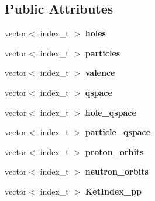 \subsection*{Public Attributes}
\begin{DoxyCompactItemize}
\item 
\hypertarget{classModelSpace_a540070f4df481d7fb5862d9c392e73c3}{vector$<$ index\-\_\-t $>$ {\bfseries holes}}\label{classModelSpace_a540070f4df481d7fb5862d9c392e73c3}

\item 
\hypertarget{classModelSpace_a5e3511a14dcd3cea30815de14100812c}{vector$<$ index\-\_\-t $>$ {\bfseries particles}}\label{classModelSpace_a5e3511a14dcd3cea30815de14100812c}

\item 
\hypertarget{classModelSpace_a2cb4a1691177ce70d7e538866b3adf2a}{vector$<$ index\-\_\-t $>$ {\bfseries valence}}\label{classModelSpace_a2cb4a1691177ce70d7e538866b3adf2a}

\item 
\hypertarget{classModelSpace_ae50f91078466cce0d733a72f38187dae}{vector$<$ index\-\_\-t $>$ {\bfseries qspace}}\label{classModelSpace_ae50f91078466cce0d733a72f38187dae}

\item 
\hypertarget{classModelSpace_ae5d98dbd7e0973064e00ce6ba9b48844}{vector$<$ index\-\_\-t $>$ {\bfseries hole\-\_\-qspace}}\label{classModelSpace_ae5d98dbd7e0973064e00ce6ba9b48844}

\item 
\hypertarget{classModelSpace_a4e94927ab033c8aef93b0e33823b2954}{vector$<$ index\-\_\-t $>$ {\bfseries particle\-\_\-qspace}}\label{classModelSpace_a4e94927ab033c8aef93b0e33823b2954}

\item 
\hypertarget{classModelSpace_a2a2c23a13d4eb11098e0d34ff7f88649}{vector$<$ index\-\_\-t $>$ {\bfseries proton\-\_\-orbits}}\label{classModelSpace_a2a2c23a13d4eb11098e0d34ff7f88649}

\item 
\hypertarget{classModelSpace_ae4fbf4fb5c2dee1f1d572e3d35708948}{vector$<$ index\-\_\-t $>$ {\bfseries neutron\-\_\-orbits}}\label{classModelSpace_ae4fbf4fb5c2dee1f1d572e3d35708948}

\item 
\hypertarget{classModelSpace_a52b5044ad3b3040cf7a84ddca14a4f0e}{vector$<$ index\-\_\-t $>$ {\bfseries Ket\-Index\-\_\-pp}}\label{classModelSpace_a52b5044ad3b3040cf7a84ddca14a4f0e}


\end{DoxyCompactItemize}

